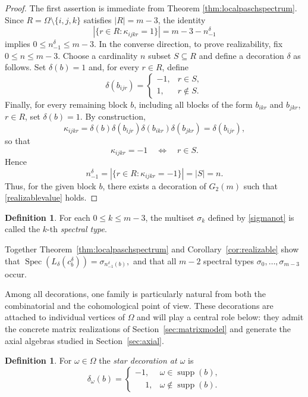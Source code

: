\documentclass[times,11pt,reqno]{amsproc}
\theoremstyle{definition}
\newtheorem{definition}[theorem]{Definition}
\numberwithin{equation}{section}
\DeclareMathOperator{\supp}{supp}
\DeclareMathOperator{\Spec}{Spec}
\begin{document}
\begin{proof}
The first assertion is immediate from Theorem
\ref{thm:localpaschspectrum}. Since
$R=\Omega\setminus\{i,j,k\}
$ satisfies $|R|=m-3$, the identity
$$
|\{r\in R:\kappa_{ijkr}=1\}|
=
m-3-n^{\delta}_{-1}
$$
implies
$0\le n^{\delta}_{-1}\le m-3.$
In the converse direction, to prove realizability, fix
$0\le n\le m-3$. Choose a cardinality $n$ subset $S\subseteq R$ and define a decoration $\delta$ as follows. Set
$\delta(b)=1$ and, for every $r\in R$, define
$$
\delta(b_{ijr})
=
\left\{
\begin{array}{ll}
-1,
&
r\in S,
\\
1,
&
r\notin S.
\end{array}
\right.
$$
Finally, for every remaining block $b$, including all blocks of the form
$b_{ikr}$ and $b_{jkr}$, $r\in R$, set
$\delta(b)=1$.
By construction,
$$
\kappa_{ijkr}
=
\delta(b)
\delta(b_{ijr})
\delta(b_{ikr})
\delta(b_{jkr})
=
\delta(b_{ijr}),
$$
so that
$$
\kappa_{ijkr}=-1
\quad\Longleftrightarrow\quad
r\in S.
$$
Hence
$$
n^{\delta}_{-1}
=
|\{r\in R:\kappa_{ijkr}=-1\}|
=
|S|
=
n.
$$
Thus, for the given block $b$, there exists a decoration of
$G_2(m)$ such that \eqref{realizablevalue} holds.
\end{proof}



\begin{definition}
For each $0\le k\le m-3$, the multiset
$\sigma_k$ defined by \eqref{sigmanot} is called the $k$-th \textit{spectral type}.
\end{definition}

Together Theorem~\ref{thm:localpaschspectrum}
and Corollary~\ref{cor:realizable} show that
$
\Spec(L_\delta(c_b^\delta))
=
\sigma_{n^{\delta}_{-1}(b)},
$
and that all $m-2$ spectral types $\sigma_0,\dots,\sigma_{m-3}$ occur.



Among all decorations, one family is particularly natural from both the
combinatorial and the cohomological point of view. These decorations are
attached to individual vertices of $\Omega$ and will play
a central role below: they admit the concrete matrix realizations of
Section~\ref{sec:matrixmodel} and generate the axial algebras studied in
Section~\ref{sec:axial}.

\begin{definition}\label{def:stardec}
For $\omega\in\Omega$ the \emph{star decoration at $\omega$} is
\begin{equation}\label{stardec}
\delta_\omega(b)=
\begin{cases}
-1, & \omega\in\supp(b),\\
\phantom{-}1, & \omega\notin\supp(b).
\end{cases}
\end{equation}
\end{definition}
\end{document}
